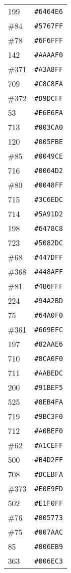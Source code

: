 \documentclass[a4paper]{article}
\begin{document}
\begin{longtable}{|l|r|}
199 & \texttt{\#6464E6} \\
\#84 & \texttt{\#5767FF} \\
\#78 & \texttt{\#6F6FFF} \\
142 & \texttt{\#AAAAF0} \\
\#371 & \texttt{\#A3A8FF} \\
709 & \texttt{\#C8C8FA} \\
\#372 & \texttt{\#D9DCFF} \\
53 & \texttt{\#E6E6FA} \\
713 & \texttt{\#003CA0} \\
120 & \texttt{\#005FBE} \\
\#85 & \texttt{\#0049CE} \\
716 & \texttt{\#0064D2} \\
\#80 & \texttt{\#0048FF} \\
715 & \texttt{\#3C6EDC} \\
714 & \texttt{\#5A91D2} \\
198 & \texttt{\#6478C8} \\
723 & \texttt{\#5082DC} \\
\#68 & \texttt{\#447DFF} \\
\#368 & \texttt{\#448AFF} \\
\#81 & \texttt{\#486FFF} \\
224 & \texttt{\#94A2BD} \\
75 & \texttt{\#64A0F0} \\
\#361 & \texttt{\#669EFC} \\
197 & \texttt{\#82AAE6} \\
710 & \texttt{\#8CA0F0} \\
711 & \texttt{\#AABEDC} \\
200 & \texttt{\#91BEF5} \\
525 & \texttt{\#8EB4FA} \\
719 & \texttt{\#9BC3F0} \\
712 & \texttt{\#A0BEF0} \\
\#62 & \texttt{\#A1CEFF} \\
500 & \texttt{\#B4D2FF} \\
708 & \texttt{\#DCEBFA} \\
\#373 & \texttt{\#E0E9FD} \\
502 & \texttt{\#E1F0FF} \\
\#76 & \texttt{\#005773} \\
\#75 & \texttt{\#007AAC} \\
85 & \texttt{\#006EB9} \\
363 & \texttt{\#006EC3} \\

\end{longtable}
\end{document}
